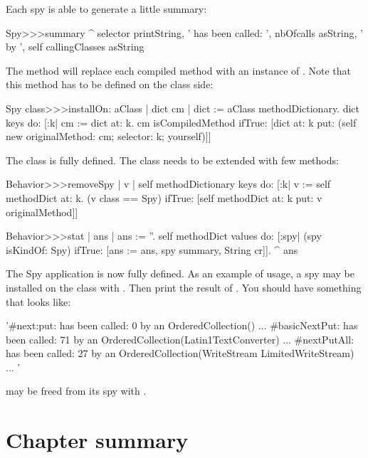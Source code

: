 \documentclass[a4paper,10pt,twoside]{book}
\begin{document}
Each spy is able to generate a little summary:

\begin{code}{}
Spy>>>summary
	^ selector printString, ' has been called: ', nbOfcalls asString, ' by ', self callingClasses asString
\end{code}

The  method will replace each compiled method with an instance of . Note that this method has to be defined on the class side:

\begin{code}{}
Spy class>>>installOn: aClass
	| dict cm |
	dict := aClass methodDictionary.
	dict keys do:
		[:k|
			cm := dict at: k.
			cm isCompiledMethod 
			 	ifTrue: [dict at: k put: (self new originalMethod: cm; selector: k; yourself)]]
			
\end{code}

The  class is fully defined. The  class needs to be extended with few methods:

\begin{code}{}
Behavior>>>removeSpy
	| v |
	self methodDictionary keys do:
		[:k|
			v := self methodDict at: k. 
			(v class == Spy)
					ifTrue: [self methodDict at: k put: v originalMethod]]

Behavior>>>stat
	| ans |
	ans := ''.
	self methodDict values do: 
		[:spy|
				(spy isKindOf: Spy)
					ifTrue: [ans := ans, spy summary, String cr]].
	^ ans
\end{code}

The Spy application is now fully defined. As an example of usage, a spy may be installed on the class  with . Then print the result of . You should have something that looks like:

\begin{code}{}
 '#next:put: has been called: 0 by an OrderedCollection()
...
#basicNextPut: has been called: 71 by an OrderedCollection(Latin1TextConverter)
...
#nextPutAll: has been called: 27 by an OrderedCollection(WriteStream LimitedWriteStream)
...
'
\end{code}

 may be freed from its spy with .
\section{Chapter summary}
\end{document}
